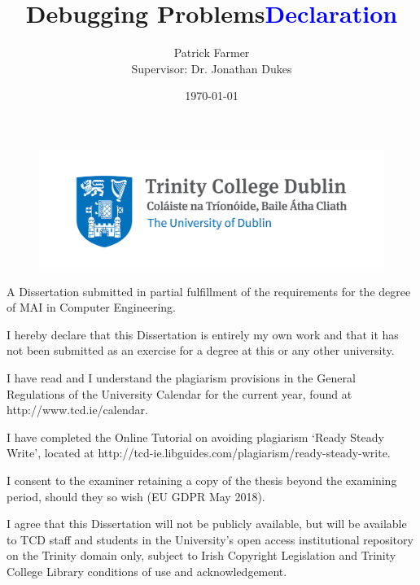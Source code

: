 \documentclass[12pt]{extarticle}
\begin{document}
\doublespacing

\title{\textbf{Debugging Problems}}
\author{Patrick Farmer\\ Supervisor: Dr. Jonathan Dukes}
\date{\today}
\maketitle

\begin{figure}[h!]
\centering
\includegraphics[width=\linewidth]{Images/Trinity_Main_Logo.jpg}
\label{fig:logo}
\end{figure}

\begin{center}
\large A Dissertation submitted in partial fulfillment of the requirements for the degree of MAI in Computer Engineering.
\end{center}

\newpage
\title {\Huge \textbf{\textcolor{blue}{Declaration}}}

\vspace{0.5cm}
\small I hereby declare that this Dissertation is entirely my own work and that it has not been submitted as an exercise for a degree at this or any other university.

\vspace{0.5cm}
\small I have read and I understand the plagiarism provisions in the General Regulations of the University Calendar for the current year, found at http://www.tcd.ie/calendar.
\vspace{0.5cm}

\small I have completed the Online Tutorial on avoiding plagiarism `Ready Steady Write', located at http://tcd-ie.libguides.com/plagiarism/ready-steady-write.
\vspace{0.5cm}

\small I consent to the examiner retaining a copy of the thesis beyond the examining period, should they so wish (EU GDPR May 2018).
\vspace{0.5cm}

\small I agree that this Dissertation will not be publicly available, but will be available to TCD staff and students in the University’s open access institutional repository on the Trinity domain only, subject to Irish Copyright Legislation and Trinity College Library conditions of use and acknowledgement.
\vspace{2cm}
\end{document}
